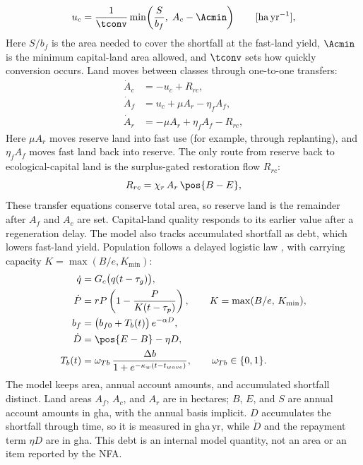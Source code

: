 \begin{equation}\label{eq:uc}
u_c=\frac{1}{\tconv}\min\!\left(\frac{S}{b_f},\;A_c-\Acmin\right)\qquad[\mathrm{ha\,yr^{-1}}],
\end{equation}
Here $S/b_f$ is the area needed to cover the shortfall at the fast-land yield, $\Acmin$ is the minimum capital-land area allowed, and $\tconv$ sets how quickly conversion occurs. Land moves between classes through one-to-one transfers:
\begin{align}
\dot A_c&=-u_c+R_{rc},\label{eq:Ac}\\
\dot A_f&=u_c+\mu A_r-\eta_f A_f,\label{eq:Af}\\
\dot A_r&=-\mu A_r+\eta_f A_f-R_{rc},\label{eq:Ar}
\end{align}
Here $\mu A_r$ moves reserve land into fast use (for example, through replanting), and $\eta_f A_f$ moves fast land back into reserve. The only route from reserve back to ecological-capital land is the surplus-gated restoration flow $R_{rc}$:
\begin{equation}\label{eq:Rrc}
R_{rc}=\chi_r\,A_r\,\pos{B-E},
\end{equation}
These transfer equations conserve total area, so reserve land is the remainder after $A_f$ and $A_c$ are set. Capital-land quality responds to its earlier value after a regeneration delay. The model also tracks accumulated shortfall as debt, which lowers fast-land yield. Population follows a delayed logistic law \citep{Pearl1925,Hutchinson1948}, with carrying capacity $K=\max(B/e,K_{\min})$:
\begin{align}
\dot q&=G_c\big(q(t-\tau_g)\big),\label{eq:q}\\
\dot P&=rP\left(1-\frac{P}{K(t-\tau_p)}\right),\qquad K=\max(B/e,\,K_{\min}),\label{eq:P}\\
b_f&=\big(b_{f0}+T_b(t)\big)\,e^{-\alpha D},\label{eq:bf}\\
\dot D&=\pos{E-B}-\eta D,\label{eq:D}\\
T_b(t)&=\omega_{Tb}\,\frac{\Delta b}{1+e^{-\kappa_w(t-t_{wave})}},\qquad \omega_{Tb}\in\{0,1\}.\label{eq:Tb}
\end{align}
The model keeps area, annual account amounts, and accumulated shortfall distinct. Land areas $A_f$, $A_c$, and $A_r$ are in hectares; $B$, $E$, and $S$ are annual account amounts in gha, with the annual basis implicit. $D$ accumulates the shortfall through time, so it is measured in gha\,yr, while $\dot D$ and the repayment term $\eta D$ are in gha. This debt is an internal model quantity, not an area or an item reported by the NFA.

